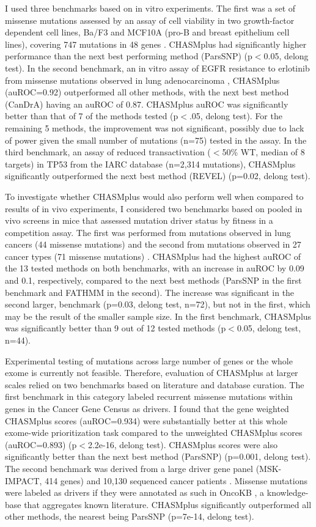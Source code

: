 I used three benchmarks based on in vitro experiments. The first was a set of missense mutations assessed by an assay of cell viability in two growth-factor dependent cell lines, Ba/F3 and MCF10A (pro-B and breast epithelium cell lines), covering 747 mutations in 48 genes \cite{RN187}. CHASMplus had significantly higher performance than the next best performing method (ParsSNP) (p$<$0.05, delong test). In the second benchmark, an in vitro assay of EGFR resistance to erlotinib from missense mutations observed in lung adenocarcinoma \cite{RN141}, CHASMplus (auROC=0.92) outperformed all other methods, with the next best method (CanDrA) having an auROC of 0.87.  CHASMplus auROC was significantly better than that of 7 of the methods tested (p$<$.05, delong test).  For the remaining 5 methods, the improvement was not significant, possibly due to lack of power given the small number of mutations (n=75) tested in the assay.  In the third benchmark, an assay of reduced transactivation ($<$50\% WT, median of 8 targets) in TP53 from the IARC database (n=2,314 mutations)\cite{RN142}, CHASMplus significantly outperformed the next best method (REVEL) (p=0.02, delong test).

To investigate whether CHASMplus would also perform well when compared to results of in vivo experiments, I considered two benchmarks based on pooled in vivo screens in mice that assessed mutation driver status by fitness in a competition assay.  The first was performed from mutations observed in lung cancers (44 missense mutations) \cite{RN141} and the second from mutations observed in 27 cancer types (71 missense mutations) \cite{RN143}. CHASMplus had the highest auROC of the 13 tested methods on both benchmarks, with an increase in auROC by 0.09 and 0.1, respectively, compared to the next best methods (ParsSNP in the first benchmark and FATHMM in the second). The increase was significant in the second larger, benchmark (p=0.03, delong test, n=72), but not in the first, which may be the result of the smaller sample size.  In the first benchmark, CHASMplus was significantly better than 9 out of 12 tested methods (p$<$0.05, delong test, n=44).

Experimental testing of mutations across large number of genes or the whole exome is currently not feasible. Therefore, evaluation of CHASMplus at larger scales relied on two benchmarks based on literature and database curation. The first benchmark in this category labeled recurrent missense mutations within genes in the Cancer Gene Census \cite{RN97} as drivers. I found that the gene weighted CHASMplus scores (auROC=0.934) were substantially better at this whole exome-wide prioritization task compared to the unweighted CHASMplus scores (auROC=0.893) (p$<$2.2e-16, delong test). CHASMplus scores were also significantly better than the next best method (ParsSNP) (p=0.001, delong test). The second benchmark was derived from a large driver gene panel (MSK-IMPACT, 414 genes) and 10,130 sequenced cancer patients \cite{RN145}.  Missense mutations were labeled as drivers if they were annotated as such in OncoKB \cite{RN144}, a knowledge-base that aggregates known literature. CHASMplus significantly outperformed all other methods, the nearest being ParsSNP (p=7e-14, delong test). 

